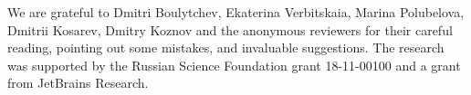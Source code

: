 \begin{acks}
We are grateful to Dmitri Boulytchev, Ekaterina Verbitskaia, Marina Polubelova, Dmitrii Kosarev, Dmitry Koznov and the anonymous reviewers for their careful reading, pointing out some mistakes, and invaluable suggestions. The research was supported by the Russian Science Foundation grant 18-11-00100 and a grant from JetBrains Research.	
\end{acks}